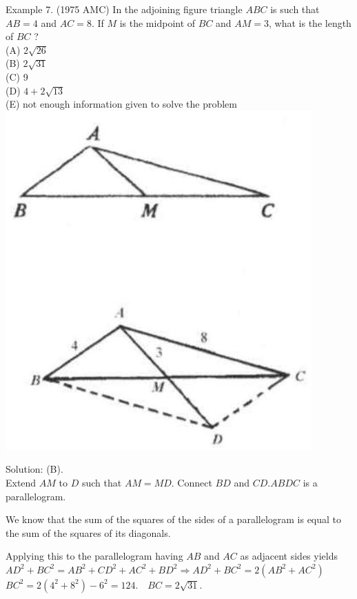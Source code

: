 \documentclass[10pt]{article}
\begin{document}
Example 7. (1975 AMC) In the adjoining figure triangle \(A B C\) is such that \(A B=4\) and \(A C=8\). If \(M\) is the midpoint of \(B C\) and \(A M=3\), what is the length of \(B C\) ?\\
(A) \(2 \sqrt{26}\)\\
(B) \(2 \sqrt{31}\)\\
(C) 9\\
(D) \(4+2 \sqrt{13}\)\\
(E) not enough information given to solve the problem\\
\includegraphics[max width=\textwidth, center]{2025_04_17_97bc1f7e44d93c271a88g-026(2)}

Solution: (B).\\
Extend \(A M\) to \(D\) such that \(A M=M D\). Connect \(B D\) and \(C D . A B D C\) is a parallelogram.

We know that the sum of the squares of the sides of a parallelogram is equal to the sum of the squares of its diagonals.

Applying this to the parallelogram having \(A B\) and \(A C\) as adjacent sides yields\\
\(A D^{2}+B C^{2}=A B^{2}+C D^{2}+A C^{2}+B D^{2} \Rightarrow A D^{2}+B C^{2}=2\left(A B^{2}+A C^{2}\right)\)\\
\(B C^{2}=2\left(4^{2}+8^{2}\right)-6^{2}=124 . \quad B C=2 \sqrt{31}\).
\end{document}
